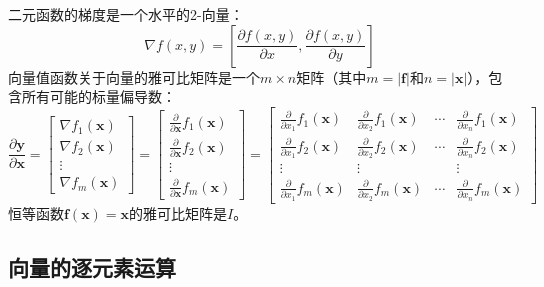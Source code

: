 \documentclass[11pt]{article}
\begin{document}
二元函数的梯度是一个水平的2-向量：
\[
\nabla f(x,y)  = \left[ \frac{\partial f(x,y)}{\partial x}, \frac{\partial f(x,y)}{\partial y} \right]
\]
向量值函数关于向量的雅可比矩阵是一个$m \times n$矩阵（其中$m=|\mathbf{f}|$和$n=|\mathbf{x}|$），包含所有可能的标量偏导数：
\[
\frac{\partial \mathbf{y}}{\partial \mathbf{x}} = 
\begin{bmatrix}
\nabla f_1(\mathbf{x}) \\
\nabla f_2(\mathbf{x})\\
\vdots\\
\nabla f_m(\mathbf{x})
\end{bmatrix} = 
\begin{bmatrix}
\frac{\partial}{\partial \mathbf{x}} f_1(\mathbf{x}) \\
\frac{\partial}{\partial \mathbf{x}} f_2(\mathbf{x})\\
\vdots\\
\frac{\partial}{\partial \mathbf{x}} f_m(\mathbf{x})
\end{bmatrix} = 
\begin{bmatrix}
\frac{\partial}{\partial x_1} f_1(\mathbf{x}) & \frac{\partial}{\partial x_2} f_1(\mathbf{x}) & \cdots & \frac{\partial}{\partial x_n} f_1(\mathbf{x}) \\
\frac{\partial}{\partial x_1} f_2(\mathbf{x}) & \frac{\partial}{\partial x_2} f_2(\mathbf{x}) & \cdots & \frac{\partial}{\partial x_n} f_2(\mathbf{x}) \\
\vdots & \vdots & & \vdots \\
\frac{\partial}{\partial x_1} f_m(\mathbf{x}) & \frac{\partial}{\partial x_2} f_m(\mathbf{x}) & \cdots & \frac{\partial}{\partial x_n} f_m(\mathbf{x})
\end{bmatrix}
\]
恒等函数$\mathbf{f(x)} = \mathbf{x}$的雅可比矩阵是$I$。


\subsection{向量的逐元素运算}\label{sec8.2}
\end{document}
